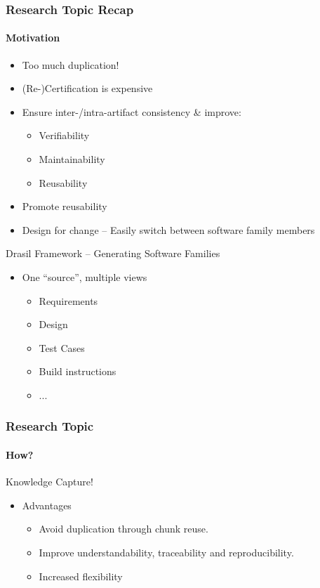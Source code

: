 \documentclass{beamer}
\begin{document}
\begin{frame}

\frametitle{Research Topic Recap}
\framesubtitle{Motivation}

\begin{itemize}
	\item Too much duplication!
	\item (Re-)Certification is expensive
	\item Ensure inter-/intra-artifact consistency \& improve:
		\begin{itemize}
			\item Verifiability
			\item Maintainability
			\item Reusability
		\end{itemize}
	\item Promote reusability
	\item Design for change -- Easily switch between software family members
\end{itemize}

\end{frame}


\begin{frame}
Drasil Framework -- Generating Software Families

\begin{itemize}
	\item One ``source'', multiple views
	\begin{itemize}
		\item Requirements%
		\item Design
		\item Test Cases
		\item Build instructions
		\item ...
	\end{itemize}
\end{itemize}
\end{frame}




\begin{frame}

\frametitle{Research Topic}
\framesubtitle{How?}

Knowledge Capture!

\begin{itemize}
\item Advantages
\begin{itemize}
\item Avoid duplication through chunk reuse.
\item Improve understandability, traceability and reproducibility.
\item Increased flexibility
\end{itemize}
\end{itemize}
\end{frame}
\end{document}

